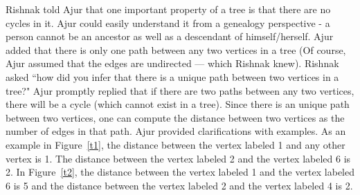 Rishnak told Ajur that one important property of a tree is that there are no cycles in it. Ajur could easily understand it from a genealogy perspective - a person cannot be an ancestor as well as a descendant of himself/herself.  Ajur added that there is only one path between any two vertices in a tree (Of course, Ajur assumed that the edges are undirected --- which Rishnak knew). Rishnak asked ``how did you infer that there is a unique path between two vertices in a tree?" Ajur promptly replied that if there are two paths between any two vertices, there will be a cycle (which cannot exist in a tree). Since there is an unique path between two vertices, one can compute the distance between two vertices as the number of edges in that path. Ajur provided clarifications with examples.  As an example in Figure~\ref{t1}, the distance between the vertex labeled 1 and any other vertex is 1. The distance between the vertex labeled 2 and the vertex labeled 6 is 2. In Figure~\ref{t2}, the distance between the vertex labeled 1 and the vertex labeled 6 is 5 and the distance between the vertex labeled 2 and the vertex labeled 4 is 2.
